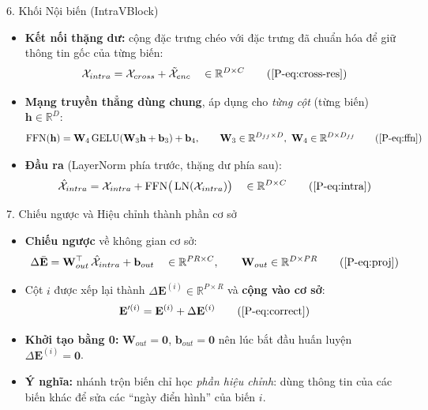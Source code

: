 \documentclass [xcolor=svgnames, notes] {beamer}
\newcommand{\R}{\mathbb{R}}
\begin{document}
\begin{frame}{6. Khối Nội biến (IntraVBlock)}
    \begin{itemize}
        \item \textbf{Kết nối thặng dư:} cộng đặc trưng chéo với đặc trưng đã chuẩn hóa để giữ thông tin gốc của từng biến:
        \[\mathcal{X}_{intra} = \mathcal{X}_{cross} + \tilde{\mathcal{X}}_{enc} \quad \in \R^{D \times C} \tag{\ref*{P-eq:cross-res}}\]

        \item \textbf{Mạng truyền thẳng dùng chung}, áp dụng cho \emph{từng cột} (từng biến) $\mathbf{h}\in\R^{D}$:
        \[\text{FFN}(\mathbf{h}) = \mathbf{W}_4\,\text{GELU}(\mathbf{W}_3\mathbf{h} + \mathbf{b}_3) + \mathbf{b}_4,
          \qquad \mathbf{W}_3\in\R^{D_{ff}\times D},\ \mathbf{W}_4\in\R^{D\times D_{ff}} \tag{\ref*{P-eq:ffn}}\]

        \item \textbf{Đầu ra} (LayerNorm phía trước, thặng dư phía sau):
        \[\hat{\mathcal{X}}_{intra} = \mathcal{X}_{intra} + \text{FFN}\big(\operatorname{LN}(\mathcal{X}_{intra})\big)
          \quad \in \R^{D \times C} \tag{\ref*{P-eq:intra}}\]

    \end{itemize}
\end{frame}

\begin{frame}{7. Chiếu ngược và Hiệu chỉnh thành phần cơ sở}
    \begin{itemize}
        \item \textbf{Chiếu ngược} về không gian cơ sở:
        \[\Delta\bar{\mathbf{E}} = \mathbf{W}_{out}^{\top}\,\hat{\mathcal{X}}_{intra} + \mathbf{b}_{out}
          \quad\in\R^{PR\times C}, \qquad \mathbf{W}_{out}\in\R^{D\times PR} \tag{\ref*{P-eq:proj}}\]

        \item Cột $i$ được xếp lại thành $\Delta\mathbf{E}^{(i)}\in\R^{P\times R}$ và \textbf{cộng vào cơ sở}:
        \[\mathbf{E}'^{(i)} = \mathbf{E}^{(i)} + \Delta\mathbf{E}^{(i)} \tag{\ref*{P-eq:correct}}\]

        \item \textbf{Khởi tạo bằng 0:} $\mathbf{W}_{out}=\mathbf{0}$, $\mathbf{b}_{out}=\mathbf{0}$ nên lúc bắt đầu huấn
              luyện $\Delta\mathbf{E}^{(i)}=\mathbf{0}$.
        \item \textbf{Ý nghĩa:} nhánh trộn biến chỉ học \emph{phần hiệu chỉnh}: dùng thông tin của các biến khác để sửa các
              ``ngày điển hình'' của biến $i$.
    \end{itemize}
\end{frame}
\end{document}
